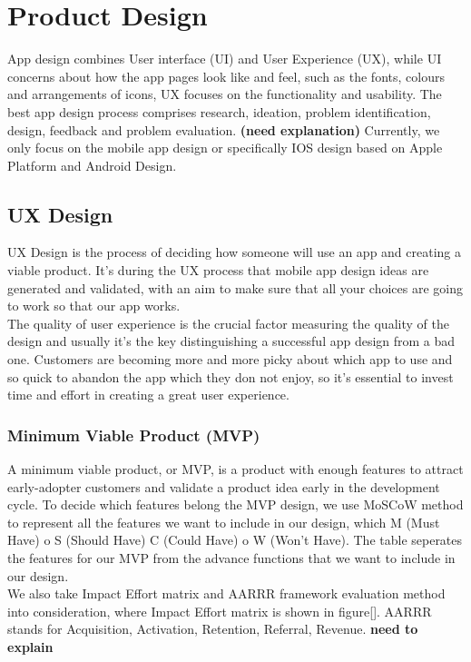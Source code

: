 
\chapter{Product Design} %

\label{Chapter2} %

App design combines User interface (UI) and User Experience (UX), while UI concerns about how the app pages look like and feel, such as the fonts, colours and arrangements of icons, UX focuses on the functionality and usability. The best app design process comprises research, 
ideation, problem identification, design, feedback and problem evaluation. \textbf{(need explanation)} Currently, we only focus on the mobile app design or specifically IOS design based on Apple Platform and Android Design. 

\section{UX Design}
UX Design is the process of deciding how someone will use an app and creating a viable product. It’s during the UX process that mobile app design ideas are generated and validated, with an aim to make sure that all your choices are going to work so that our app works. 
\\The quality of user experience is the crucial factor measuring the quality of the design and usually it's the key distinguishing a successful app design from a bad one. Customers are becoming more and more picky about which app to use and so quick to abandon the app which they don not enjoy, so it's essential to invest time and effort in creating a great user experience.
\subsection{Minimum Viable Product (MVP)}
A minimum viable product, or MVP, is a product with enough features to attract early-adopter customers and validate a product idea early in the development cycle. To decide which features belong the MVP design, we use MoSCoW method to represent all the features we want to include in our design, which M (Must Have) o S (Should Have) C (Could Have) o W (Won’t Have). 
The table seperates the features for our MVP from the advance functions that we want to include in our design.
\\We also take Impact Effort matrix and AARRR framework evaluation method into consideration, where Impact Effort matrix is shown in figure[]. 
AARRR stands for Acquisition, Activation, Retention, Referral, Revenue. \textbf{need to explain}

